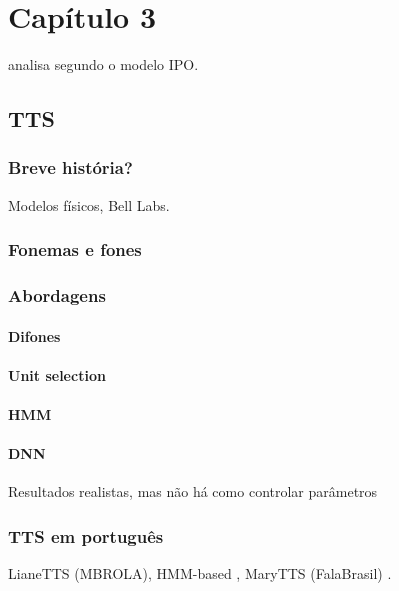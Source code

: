 
\chapter{Capítulo 3}

\cite{ipo} analisa segundo o modelo IPO.
\cite{}


\section{TTS}
\subsection{Breve história?}
Modelos físicos, Bell Labs.
\subsection{Fonemas e fones}
\subsection{Abordagens}
\subsubsection{Difones}
\subsubsection{Unit selection}
\subsubsection{HMM}
\subsubsection{DNN}
Resultados realistas, mas não há como controlar parâmetros
\subsection{TTS em português}
LianeTTS (MBROLA), HMM-based \cite{couto}, MaryTTS (FalaBrasil) \cite{falabrasil}.
